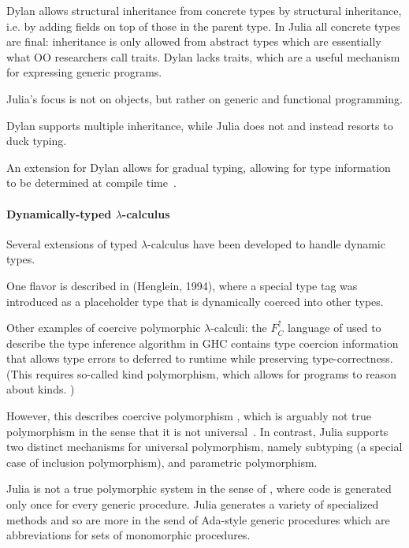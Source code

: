 Dylan allows structural inheritance from concrete types by structural inheritance, i.e. by adding fields on top of those in the parent type. In Julia all concrete types are final: inheritance is only allowed from abstract types which are essentially what OO researchers call traits. Dylan lacks traits, which are a useful mechanism for expressing generic programs.

Julia's focus is not on objects, but rather on generic and functional programming. 

Dylan supports multiple inheritance, while Julia does not and instead resorts to duck typing.

An extension for Dylan allows for gradual typing, allowing for type information to be determined at compile time~\cite{Mehnert2010}.

\paragraph{Dynamically-typed $\lambda$-calculus}

Several extensions of typed $\lambda$-calculus have been developed to handle dynamic types.

One flavor is described in (Henglein, 1994), where a special type tag 
was introduced as a placeholder type that is dynamically coerced into other
types. %

Other examples of coercive polymorphic $\lambda$-calculi: the $F^\uparrow_C$ language of \cite{Vytiniotis2012,Yorgey2012} used to describe the type inference algorithm in GHC \cite{Vytiniotis2011} contains type coercion information that allows type errors to deferred to runtime \cite{Vytiniotis2012} while preserving type-correctness. (This requires so-called kind polymorphism, which allows for programs to reason about kinds. \cite{Yorgey2012})


However, this describes coercive polymorphism \cite{Cardelli1985}, which
is arguably not true polymorphism in the sense that it is not
universal~\cite{Strachey1967}. In contrast, Julia supports two distinct
mechanisms for universal polymorphism, namely subtyping (a special case of
inclusion polymorphism), and parametric polymorphism.

Julia is not a true polymorphic system in the sense of \cite{Cardelli1985},
where code is generated only once for every generic procedure. Julia generates
a variety of specialized methods and so are more in the send of Ada-style
generic procedures which are abbreviations for sets of monomorphic procedures.




